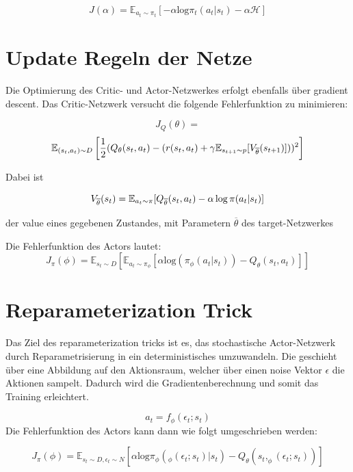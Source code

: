 \documentclass[8pt]{article}
\begin{document}
\begin{multicols}{2}
\begin{equation}
J(\alpha)=\mathbb{E}_{a_{t}\sim\pi_{t}}\left[-\alpha \mathrm{log}\pi_{t}(a_{t}|s_{t})-\alpha \mathcal{H}\right]
\end{equation}

\section{Update Regeln der Netze}
Die Optimierung des Critic- und Actor-Netzwerkes erfolgt ebenfalls über gradient descent. Das Critic-Netzwerk versucht die folgende Fehlerfunktion zu minimieren:

\begin{equation}
J_{Q}(\theta)=
\end{equation}
\begin{equation}
\mathbb{E}_{(s_{t},a_{t})\sim D}\left[\frac{1}{2}(Q_{\theta}(s_{t},a_{t})-(r(s_{t},a_{t})+\gamma \mathbb{E}_{s_{t+1}\sim p}[V_{\overline{\theta}}(s_{t+1})]))^{2}\right]\notag
\end{equation}

Dabei ist

\begin{equation}
	\mathnormal{V}_{\overline{\theta}}(s_{t}) = \mathbb{E}_{a_t \sim \pi}[\mathnormal{Q}_{\overline{\theta}}(s_t, a_t) - \alpha \, \mathrm{log} \, \pi (a_t|s_t)]
\end{equation}

der value eines gegebenen Zustandes, mit Parametern $\overline{\theta}$ des target-Netzwerkes

Die Fehlerfunktion des Actors lautet:
\begin{equation}
J_{\pi}(\phi)=\mathbb{E}_{s_{t}\sim D}\left[\mathbb{E}_{a_{t}\sim \pi_{\phi}}\left[\alpha \mathrm{log}(\pi_{\phi}(a_{t}|s_{t}))-Q_{\theta}(s_{t},a_{t})\right]\right]
\end{equation}

\section{Reparameterization Trick}
Das Ziel des reparameterization tricks ist es, das stochastische Actor-Netzwerk durch Reparametrisierung in ein deterministisches umzuwandeln. Die geschieht über eine Abbildung auf den Aktionsraum, welcher über einen noise Vektor $\epsilon$ die Aktionen sampelt. Dadurch wird die Gradientenberechnung und somit das Training erleichtert.

\begin{equation}
a_{t}=f_{\phi}(\epsilon_{t};s_{t})
\end{equation}
Die Fehlerfunktion des Actors kann dann wie folgt umgeschrieben werden:

\begin{equation}
J_{\pi}(\phi)=\mathbb{E}_{s_{t}\sim D,\epsilon_{t}\sim N}\left[\alpha\mathrm{log}\pi_{\phi}(_{\phi}(\epsilon_{t};s_{t})|s_{t})-Q_{\theta}(s_{t},_{\phi}(\epsilon_{t};s_{t}))\right]
\end{equation}



\end{multicols}
\end{document}
